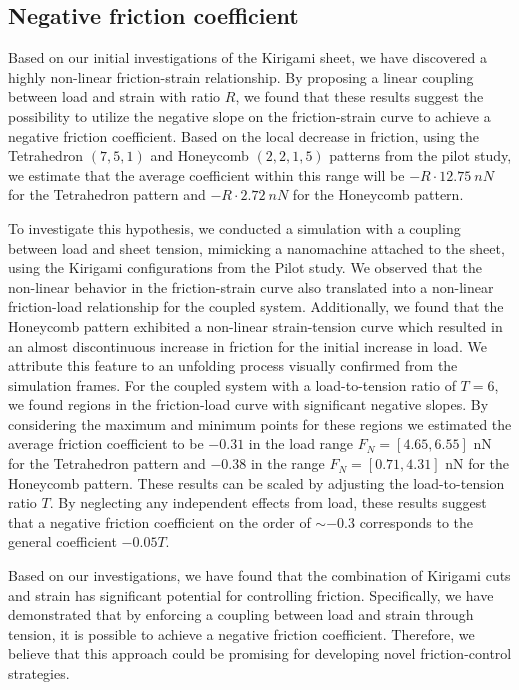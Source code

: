 \subsection{Negative friction coefficient}
Based on our initial investigations of the Kirigami sheet, we have discovered a
highly non-linear friction-strain relationship. By proposing a linear coupling
between load and strain with ratio $R$, we found that these results suggest the
possibility to utilize the negative slope on the friction-strain curve to
achieve a negative friction coefficient. Based on the local decrease in friction, using the Tetrahedron $(7,5,1)$ and Honeycomb $(2,2,1,5)$ patterns
from the pilot study, we estimate that the average coefficient within this range
will be $-R\cdot\SI{12.75}{nN}$ for the Tetrahedron pattern and
$-R\cdot\SI{2.72}{nN}$ for the Honeycomb pattern.

To investigate this hypothesis, we conducted a simulation with a coupling
between load and sheet tension, mimicking a nanomachine attached to the sheet,
using the Kirigami configurations from the Pilot study. We observed that the non-linear behavior in the friction-strain curve also translated into a non-linear friction-load relationship for the coupled system. Additionally, we found that the Honeycomb pattern exhibited a non-linear strain-tension curve which resulted in an almost discontinuous increase in friction for the initial
increase in load. We attribute this feature to an unfolding process visually
confirmed from the simulation frames. For the coupled system with a
load-to-tension ratio of $T=6$, we found regions in the friction-load curve with
significant negative slopes. By considering the maximum and minimum points for
these regions we estimated the average friction coefficient to be $-0.31$ in the
load range $F_N = [4.65, 6.55]$ nN for the Tetrahedron pattern and $-0.38$ in the
range $F_N = [0.71, 4.31]$ nN for the Honeycomb pattern. These results can be scaled by adjusting the load-to-tension ratio $T$. By neglecting any independent effects from load, these results suggest that a negative friction coefficient on the order of $\sim -0.3$ corresponds to the general coefficient $-0.05 T$.

Based on our investigations, we have found that the combination of Kirigami cuts and strain has significant potential for controlling friction. Specifically, we have demonstrated that by enforcing a coupling between load and strain through tension, it is possible to achieve a negative friction coefficient. Therefore, we believe that this approach could be promising for developing novel friction-control strategies.


